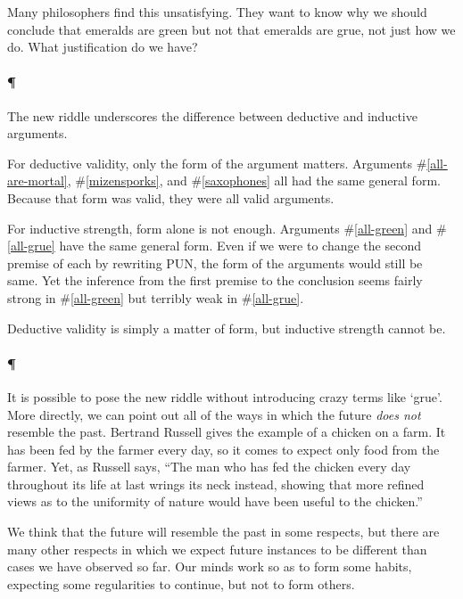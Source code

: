\documentclass[]{article}
\newcommand*{\newbit}{\paragraph{\P}}
\begin{document}
Many philosophers find this unsatisfying. They want to know why we should conclude that emeralds are green but not that emeralds are grue, not just how we do. What justification do we have?

\newbit The new riddle underscores the difference between deductive and inductive arguments.

For deductive validity, only the form of the argument matters. Arguments \#\ref{all-are-mortal}, \#\ref{mizensporks}, and \#\ref{saxophones} all had the same general form. Because that form was valid, they were all valid arguments.

For inductive strength, form alone is not enough. Arguments \#\ref{all-green} and \#\ref{all-grue} have the same general form. Even if we were to change the second premise of each by rewriting PUN, the form of the arguments would still be same. Yet the inference from the first premise to the conclusion seems fairly strong in \#\ref{all-green} but terribly weak in \#\ref{all-grue}. 

Deductive validity is simply a matter of form, but inductive strength cannot be.


\newbit It is possible to pose the new riddle without introducing crazy terms like `grue'. More directly, we can point out all of the ways in which the future \emph{does not} resemble the past. Bertrand Russell gives the example of a chicken on a farm. It has been fed by the farmer every day, so it comes to expect only food from the farmer. Yet, as Russell says, ``The man who has fed the chicken every day throughout its life at last wrings its neck instead, showing that more refined views as to the uniformity of nature would have been useful to the chicken.''


We think that the future will resemble the past in some respects, but there are many other respects in which we expect future instances to be different than cases we have observed so far. Our minds work so as to form some habits, expecting some regularities  to continue, but not to form others.
\end{document}
